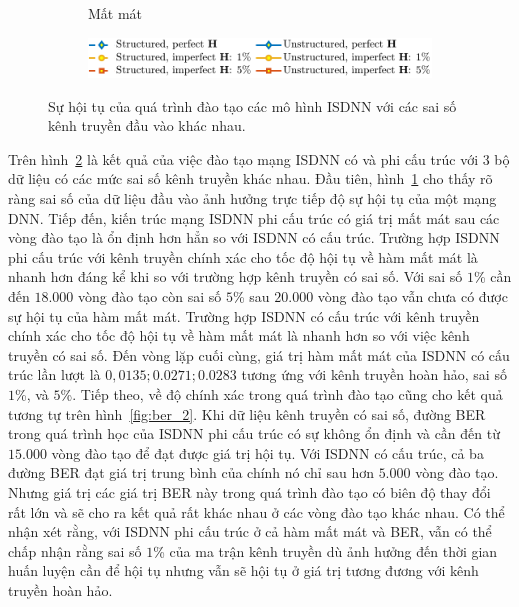 \begin{figure}[ht]
\begin{subfigure}[b]{0.48\textwidth}
        \caption{Mất mát}
        \label{fig:loss_2}
    \end{subfigure}
    \hfill
    \begin{subfigure}{\linewidth}
        \centering
        \includegraphics[width=.8\linewidth]{figures/lg_performance_2.pdf}
    \end{subfigure}
    \caption{Sự hội tụ của quá trình đào tạo các mô hình ISDNN với các sai số kênh truyền đầu vào khác nhau.}
    \label{fig:training_2}
\end{figure}

Trên hình~\ref{fig:training_2} là kết quả của việc đào tạo mạng ISDNN có và phi cấu trúc với $3$ bộ dữ liệu có các mức sai số kênh truyền khác nhau. Đầu tiên, hình~\ref{fig:loss_2} cho thấy rõ ràng sai số của dữ liệu đầu vào ảnh hưởng trực tiếp độ sự hội tụ của một mạng DNN. Tiếp đến, kiến trúc mạng ISDNN phi cấu trúc có giá trị mất mát sau các vòng đào tạo là ổn định hơn hẳn so với ISDNN có cấu trúc.
Trường hợp ISDNN phi cấu trúc với kênh truyền chính xác cho tốc độ hội tụ về hàm mất mát là nhanh hơn đáng kể khi so với trường hợp kênh truyền có sai số. Với sai số $1$\% cần đến $18.000$ vòng đào tạo còn sai số $5$\% sau $20.000$ vòng đào tạo vẫn chưa có được sự hội tụ của hàm mất mát. Trường hợp ISDNN có cấu trúc với kênh truyền chính xác cho tốc độ hội tụ về hàm mất mát là nhanh hơn so với việc kênh truyền có sai số. Đến vòng lặp cuối cùng, giá trị hàm mất mát của ISDNN có cấu trúc lần lượt là $0,0135; 0.0271; 0.0283$ tương ứng với kênh truyền hoàn hảo, sai số $1$\%, và $5$\%. Tiếp theo, về độ chính xác trong quá trình đào tạo cũng cho kết quả tương tự trên hình~\ref{fig:ber_2}. Khi dữ liệu kênh truyền có sai số, đường BER trong quá trình học của ISDNN phi cấu trúc có sự không ổn định và cần đến từ $15.000$ vòng đào tạo để đạt được giá trị hội tụ. Với ISDNN có cấu trúc, cả ba đường BER đạt giá trị trung bình của chính nó chỉ sau hơn $5.000$ vòng đào tạo. Nhưng giá trị các giá trị BER này trong quá trình đào tạo có biên độ thay đổi rất lớn và sẽ cho ra kết quả rất khác nhau ở các vòng đào tạo khác nhau. Có thể nhận xét rằng, với ISDNN phi cấu trúc ở cả hàm mất mát và BER, vẫn có thể chấp nhận rằng sai số $1$\% của ma trận kênh truyền dù ảnh hưởng đến thời gian huấn luyện cần để hội tụ nhưng vẫn sẽ hội tụ ở giá trị tương đương với kênh truyền hoàn hảo. 

